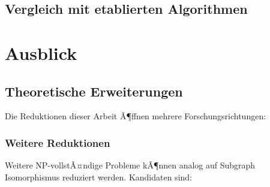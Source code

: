 ﻿\documentclass[a4paper,12pt]{article}
\theoremstyle{definition}
\begin{document}
\subsection{Vergleich mit etablierten Algorithmen}

\begin{table}[h]
	\centering
	\caption{Vergleich klassischer mit Subgraph Isomorphismus-basierten Methoden.}
\end{table}

\section{Ausblick}\label{sec:ausblick}

\subsection{Theoretische Erweiterungen}

Die Reduktionen dieser Arbeit Ã¶ffnen mehrere Forschungsrichtungen:

\subsubsection{Weitere Reduktionen}

Weitere NP-vollstÃ¤ndige Probleme kÃ¶nnen analog auf Subgraph Isomorphismus reduziert werden. Kandidaten sind:
\end{document}
